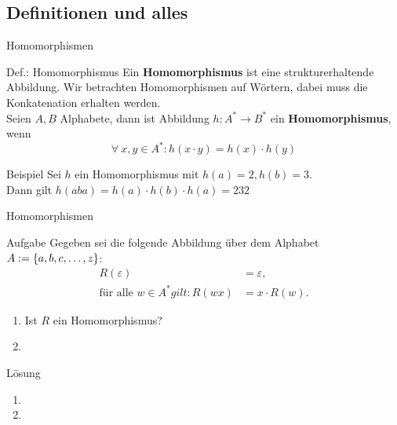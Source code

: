 \subsection{Definitionen und alles}
\begin{frame}{Homomorphismen}
	\begin{block}{Def.: Homomorphismus}
		Ein \textbf{Homomorphismus} ist eine strukturerhaltende Abbildung. Wir betrachten Homomorphismen auf Wörtern, dabei muss die Konkatenation erhalten werden.\\
		Seien $A, B$ Alphabete, dann ist Abbildung $h: A^* \to B^*$ ein \textbf{Homomorphismus}, wenn
		$$ \forall\ x, y\in A^* : h(x \cdot y) = h(x) \cdot h(y) $$
	\end{block}
	
	\begin{exampleblock}{Beispiel}
		Sei $h$ ein Homomorphismus mit $h(a) = 2, h(b) = 3$. \\
		Dann gilt $h(aba) = h(a) \cdot h(b) \cdot h(a) = 232 $
	\end{exampleblock}
\end{frame}

\begin{frame}{Homomorphismen}
	\begin{exampleblock}{Aufgabe}
		Gegeben sei die folgende Abbildung über dem Alphabet $A:=\left\{ a, b, c, \dots, z \right\}$:
		\begin{align*}
			R(\varepsilon) &= \varepsilon,\\
			\text{für alle } w \in A^* gilt: R(wx) &= x \cdot R(w).
		\end{align*}
		\begin{enumerate}
			\item Ist $R$ ein Homomorphismus?
			\item {}
		\end{enumerate}
	\end{exampleblock}

	\begin{block}{Lösung}
		\begin{enumerate}
			\item {}
			\item {}
		\end{enumerate}
	\end{block}
\end{frame}

